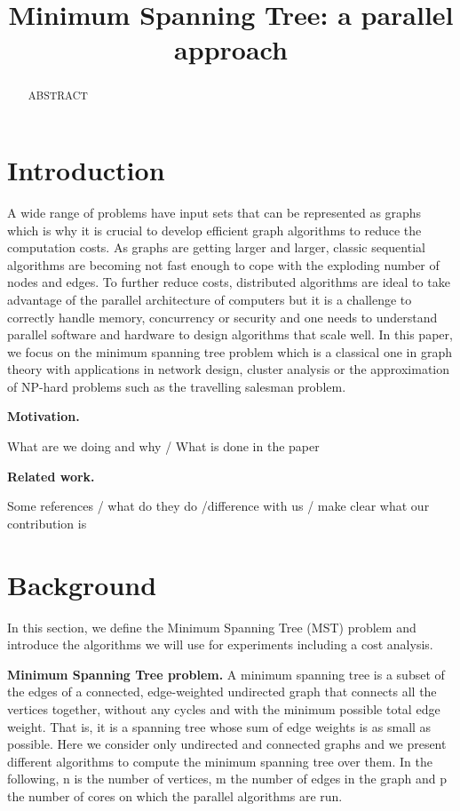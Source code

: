 \documentclass[letterpaper]{article}
\title{Minimum Spanning Tree: a parallel approach}
\newcommand{\mypar}[1]{{\bf #1.}}
\begin{document}
%
\maketitle
%


\begin{abstract}

ABSTRACT

\end{abstract}

\section{Introduction}\label{sec:intro}

A wide range of problems have input sets that can be represented as graphs which is why it is crucial to develop efficient graph algorithms to reduce the computation costs. As graphs are getting larger and larger, classic sequential algorithms are becoming not fast enough to cope with the exploding number of nodes and edges. To further reduce costs, distributed algorithms are ideal to take advantage of the parallel architecture of computers but it is a challenge to correctly handle memory, concurrency or security and one needs to understand parallel software and hardware to design algorithms that scale well.
In this paper, we focus on the minimum spanning tree problem which is a classical one in graph theory with applications in network design, cluster analysis or the approximation of NP-hard problems such as the travelling salesman problem.

\mypar{Motivation} 

What are we doing and why / What is done in the paper

\mypar{Related work} 

Some references / what do they do /difference with us / make clear what our contribution is

\section{Background}\label{sec:background}

In this section, we define the Minimum Spanning Tree (MST) problem and introduce the algorithms we will use for experiments including a cost analysis.

\mypar{Minimum Spanning Tree problem}
A minimum spanning tree is a subset of the edges of a connected, edge-weighted undirected graph that connects all the vertices together, without any cycles and with the minimum possible total edge weight. That is, it is a spanning tree whose sum of edge weights is as small as possible. Here we consider only undirected and connected graphs and we present different algorithms to compute the minimum spanning tree over them. In the following, n is the number of vertices, m the number of edges in the graph and p the number of cores on which the parallel algorithms are run.
\end{document}
